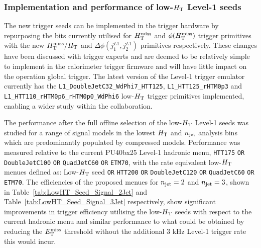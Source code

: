 \subsubsection{Implementation and performance of low-$\mbox{$H_\text{T}$}$ Level-1 seeds}

The new trigger seeds can be implemented in the trigger hardware by repurposing the bits currently utilised for $\mbox{$H_{\rm T}^{\rm miss}$}$ and $\phi({\mbox{$H_{\rm T}^{\rm miss}$}})$ trigger primitives with the new $\mbox{$H_{\rm T}^{\rm miss}$}/\mbox{$H_\text{T}$}$ and $\Delta\phi(j_{1}^{L1},j_{2}^{L1})$ primitives respectively. These changes have been discussed with trigger experts and are deemed to be relatively simple to implement in the calorimeter trigger firmware and will have little impact on the operation global trigger. The latest version of the Level-1 trigger emulator currently has the \verb!L1_DoubleJetC32_WdPhi7_HTT125!, \verb!L1_HTT125_rHTM0p3! and \\ \verb!L1_HTT110_rHTM0p6_rHTM0p0_WdPhi6! low-$\mbox{$H_\text{T}$}$ trigger primitives implemented, enabling a wider study within the collaboration.

The performance after the full offline selection of the low-$\mbox{$H_\text{T}$}$ Level-1 seeds was studied for a range of signal models in the lowest $\mbox{$H_\text{T}$}$ and $n_{\text{jet}}$ analysis bins which are predominantly populated by compressed models. Performance was measured relative to the current PU40bx25 Level-1 hadronic menu, {\verb!HTT175! \verb!OR! \verb!DoubleJetC100! \verb!OR! \verb!QuadJetC60! \verb!OR! \verb!ETM70!}, with the rate equivalent low-$\mbox{$H_\text{T}$}$ menues defined as: Low-$\mbox{$H_\text{T}$}$ seed {\verb!OR! \verb!HTT200! \verb!OR! \verb!DoubleJetC120! \verb!OR! \verb!QuadJetC60! \verb!OR! \verb!ETM70!}. The efficiencies of the proposed menues for $n_{\text{jet}} = 2$ and $n_{\text{jet}} = 3$, shown in Table~\ref{tab:LowHT_Seed_Signal_2Jet} and Table~\ref{tab:LowHT_Seed_Signal_3Jet} respectively, show significant improvements in trigger efficiency utilising the low-$\mbox{$H_\text{T}$}$ seeds with respect to the current hadronic menu and similar performance to what could be obtained by reducing the $\mbox{$E_\text{T}^{\rm miss}$}$ threshold without the additional 3 kHz Level-1 trigger rate this would incur.



